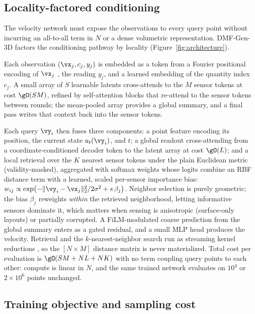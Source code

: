 \documentclass{article} %
\newcommand{\model}{DMF-Gen-3D}
\begin{document}
\subsection{Locality-factored conditioning}
\label{sec:method-arch}

The velocity network must expose the observations to every query point without incurring an all-to-all term in $N$ or a dense volumetric representation. \model{} factors the conditioning pathway by locality (Figure~\ref{fig:architecture}).

Each observation $(\vx_j,c_j,y_j)$ is embedded as a token from a Fourier positional encoding of $\vx_j$ \citep{tancik2020fourier}, the reading $y_j$, and a learned embedding of the quantity index $c_j$. A small array of $S$ learnable latents cross-attends to the $M$ sensor tokens \citep{jaegle2021perceiver} at cost $\gO(SM)$, refined by self-attention blocks that re-attend to the sensor tokens between rounds; the mean-pooled array provides a global summary, and a final pass writes that context back into the sensor tokens.

Each query $\vy_i$ then fuses three components: a point feature encoding its position, the current state $u_t(\vy_i)$, and $t$; a global readout cross-attending from a coordinate-conditioned decoder token to the latent array at cost $\gO(L)$; and a local retrieval over the $K$ nearest sensor tokens under the plain Euclidean metric (validity-masked), aggregated with softmax weights whose logits combine an RBF distance term with a learned, scaled per-sensor importance bias: $w_{ij}\propto\exp\!\big({-}\|\vy_i-\vx_j\|_2^2/2\sigma^2+s\,\beta_j\big)$. Neighbor selection is purely geometric; the bias $\beta_j$ reweights \emph{within} the retrieved neighborhood, letting informative sensors dominate it, which matters when sensing is anisotropic (surface-only layouts) or partially corrupted. A FiLM-modulated coarse prediction from the global summary enters as a gated residual, and a small MLP head produces the velocity. Retrieval and the $k$-nearest-neighbor search run as streaming kernel reductions \citep{charlier2021kernel}, so the $[N{\times}M]$ distance matrix is never materialized. Total cost per evaluation is $\gO(SM + NL + NK)$ with no term coupling query points to each other: compute is linear in $N$, and the same trained network evaluates on $10^{4}$ or $2\times10^{6}$ points unchanged.

\subsection{Training objective and sampling cost}
\label{sec:method-objective}
\end{document}
